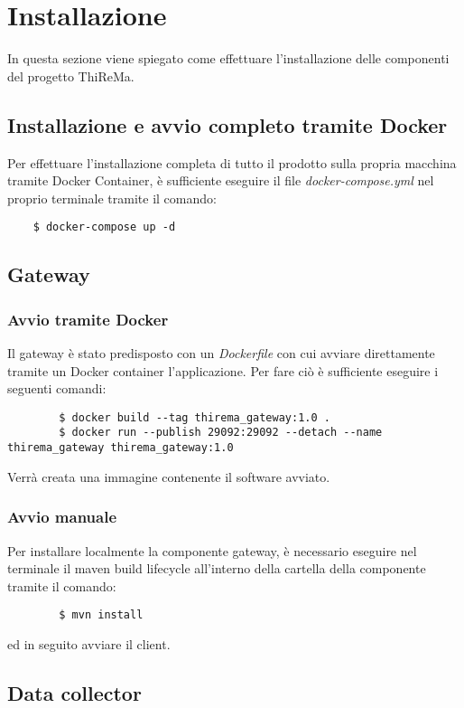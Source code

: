 \section{Installazione}
	In questa sezione viene spiegato come effettuare l'installazione delle componenti del progetto ThiReMa.

	\subsection{Installazione e avvio completo tramite Docker}
	
	Per effettuare l'installazione completa di tutto il prodotto sulla propria macchina tramite Docker Container, è sufficiente eseguire il file \textit{docker-compose.yml} nel proprio terminale tramite il comando:
	\begin{verbatim}
	$ docker-compose up -d
	\end{verbatim}

	\subsection{Gateway}
		
		\subsubsection{Avvio tramite Docker}
		Il gateway è stato predisposto con un \textit{Dockerfile} con cui avviare direttamente tramite un Docker container l'applicazione. Per fare ciò è sufficiente eseguire i seguenti comandi:
		\begin{verbatim}
		$ docker build --tag thirema_gateway:1.0 .
		$ docker run --publish 29092:29092 --detach --name thirema_gateway thirema_gateway:1.0
		\end{verbatim}
		Verrà creata una immagine contenente il software avviato.

		\subsubsection{Avvio manuale}
		Per installare localmente la componente gateway, è necessario eseguire nel terminale il maven build lifecycle all'interno della cartella della componente tramite il comando:
		\begin{verbatim}
		$ mvn install
		\end{verbatim}
		ed in seguito avviare il client.

	\subsection{Data collector}

